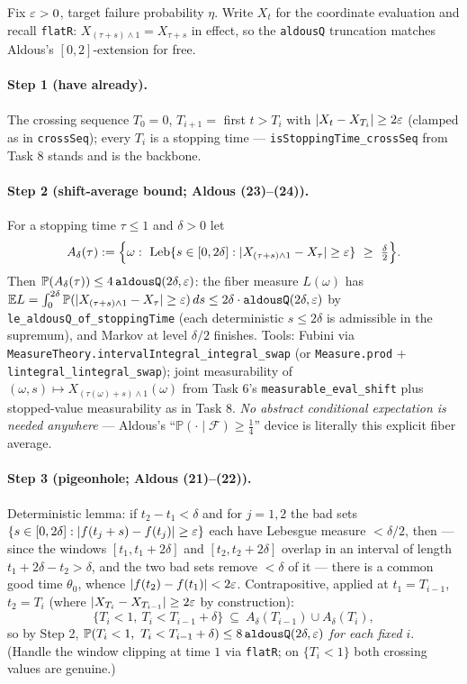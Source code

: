 \documentclass[11pt]{article}
\theoremstyle{plain}
\theoremstyle{remark}
\newcommand{\E}{\mathbb{E}}\newcommand{\PP}{\mathbb{P}}\newcommand{\R}{\mathbb{R}}
\begin{document}
Fix $\varepsilon>0$, target failure probability $\eta$. Write $X_t$ for the
coordinate evaluation and recall \texttt{flatR}: $X_{(\tau+s)\wedge 1}=
X_{\tau+s}$ in effect, so the \texttt{aldousQ} truncation matches Aldous's
$[0,2]$-extension for free.

\paragraph{Step 1 (have already).} The crossing sequence $T_0=0$,
$T_{i+1}=$ first $t>T_i$ with $|X_t-X_{T_i}|\ge 2\varepsilon$ (clamped as in
\texttt{crossSeq}); every $T_i$ is a stopping time ---
\texttt{isStoppingTime\_crossSeq} from Task 8 stands and is the backbone.

\paragraph{Step 2 (shift-average bound; Aldous (23)--(24)).} For a stopping
time $\tau\le1$ and $\delta>0$ let
\[
A_\delta(\tau):=\Big\{\omega:\ \Leb\{s\in[0,2\delta]:
|X_{(\tau+s)\wedge1}-X_\tau|\ge\eps\}\ \ge\ \tfrac{\delta}{2}\Big\}.
\]
Then $\PP(A_\delta(\tau))\le 4\,\texttt{aldousQ}(2\delta,\eps)$: the fiber
measure $L(\omega)$ has $\E L=\int_0^{2\delta}\PP(|X_{(\tau+s)\wedge1}
-X_\tau|\ge\eps)\,ds\le 2\delta\cdot\texttt{aldousQ}(2\delta,\eps)$ by
\texttt{le\_aldousQ\_of\_stoppingTime} (each deterministic $s\le2\delta$ is
admissible in the supremum), and Markov at level $\delta/2$ finishes. Tools:
Fubini via \texttt{MeasureTheory.intervalIntegral\_integral\_swap} (or
\texttt{Measure.prod} + \texttt{lintegral\_lintegral\_swap}); joint
measurability of $(\omega,s)\mapsto X_{(\tau(\omega)+s)\wedge1}(\omega)$
from Task 6's \texttt{measurable\_eval\_shift} plus stopped-value
measurability as in Task 8. \emph{No abstract conditional expectation is
needed anywhere} --- Aldous's ``$\PP(\cdot\mid\mathcal F)\ge\frac14$''
device is literally this explicit fiber average.

\paragraph{Step 3 (pigeonhole; Aldous (21)--(22)).} Deterministic lemma: if
$t_2-t_1<\delta$ and for $j=1,2$ the bad sets
$\{s\in[0,2\delta]:|f(t_j+s)-f(t_j)|\ge\varepsilon\}$ each have Lebesgue measure
$<\delta/2$, then --- since the windows $[t_1,t_1+2\delta]$ and
$[t_2,t_2+2\delta]$ overlap in an interval of length
$t_1+2\delta-t_2>\delta$, and the two bad sets remove $<\delta$ of it ---
there is a common good time $\theta_0$, whence
$|f(t_2)-f(t_1)|<2\varepsilon$. Contrapositive, applied at $t_1=T_{i-1}$,
$t_2=T_i$ (where $|X_{T_i}-X_{T_{i-1}}|\ge2\varepsilon$ by construction):
\[
\{T_i<1,\ T_i<T_{i-1}+\delta\}\ \subseteq\
A_\delta(T_{i-1})\cup A_\delta(T_i),
\]
so by Step 2, $\PP(T_i<1,\ T_i<T_{i-1}+\delta)\le
8\,\texttt{aldousQ}(2\delta,\eps)$ \emph{for each fixed} $i$. (Handle the
window clipping at time $1$ via \texttt{flatR}; on $\{T_i<1\}$ both
crossing values are genuine.)
\end{document}

